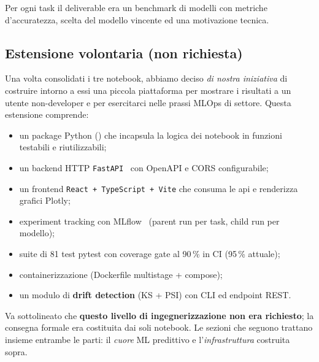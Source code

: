 Per ogni task il deliverable era un benchmark di modelli con metriche
d'accuratezza, scelta del modello vincente ed una motivazione tecnica.

\subsection{Estensione volontaria (non richiesta)}

Una volta consolidati i tre notebook, abbiamo deciso \emph{di nostra
iniziativa} di costruire intorno a essi una piccola piattaforma per
mostrare i risultati a un utente non-developer e per esercitarci nelle
prassi MLOps di settore. Questa estensione comprende:
\begin{itemize}
  \item un package Python () che incapsula la logica dei
        notebook in funzioni testabili e riutilizzabili;
  \item un backend HTTP \texttt{FastAPI}~\cite{fastapi} con OpenAPI e CORS
        configurabile;
  \item un frontend \texttt{React + TypeScript + Vite} che consuma le
        \acrshort{api} e renderizza grafici Plotly;
  \item experiment tracking con MLflow~\cite{mlflow2018} (parent run per
        task, child run per modello);
  \item suite di 81 test pytest con coverage gate al 90\,\% in CI (95\,\% attuale);
  \item containerizzazione (Dockerfile multistage + compose);
  \item un modulo di \textbf{drift detection} (KS + PSI) con CLI ed
        endpoint REST.
\end{itemize}

Va sottolineato che \textbf{questo livello di ingegnerizzazione non era
richiesto}; la consegna formale era costituita dai soli notebook. Le
sezioni che seguono trattano insieme entrambe le parti: il \emph{cuore}
ML predittivo e l'\emph{infrastruttura} costruita sopra.
